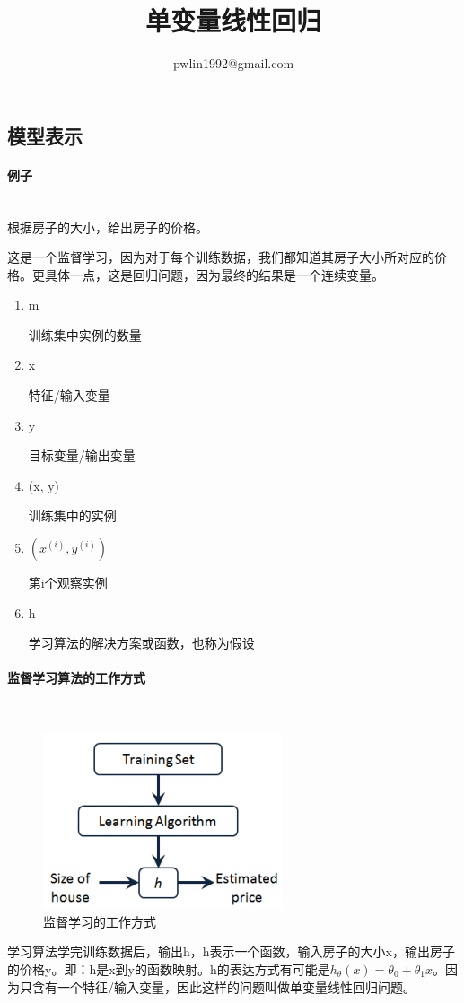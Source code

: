 \documentclass{article}
\title{单变量线性回归}
\author{pwlin1992@gmail.com}
\begin{document}
\maketitle
\tableofcontents
\begin{large}
  \section{模型表示}
  \paragraph{例子}\mbox{} \\
  \indent 根据房子的大小，给出房子的价格。

  这是一个监督学习，因为对于每个训练数据，我们都知道其房子大小所对应的价格。更具体一点，这是回归问题，因为最终的结果是一个连续变量。

  \begin{enumerate}
  \item m

    训练集中实例的数量
  \item x

    特征/输入变量
  \item y

    目标变量/输出变量
  \item (x, y)

    训练集中的实例
  \item $(x^{(i)}, y^{(i)})$

    第i个观察实例
  \item h

    学习算法的解决方案或函数，也称为假设
  \end{enumerate}

  \paragraph{监督学习算法的工作方式}\mbox{} \\
  \begin{figure}[h]
    \centering
    \includegraphics{0.PNG}
    \caption{监督学习的工作方式}
  \end{figure}
  \indent 学习算法学完训练数据后，输出h，h表示一个函数，输入房子的大小x，输出房子的价格y。即：h是x到y的函数映射。h的表达方式有可能是$h_\theta(x)=\theta_0+\theta_1x$。因为只含有一个特征/输入变量，因此这样的问题叫做单变量线性回归问题。


\end{large}
\end{document}
